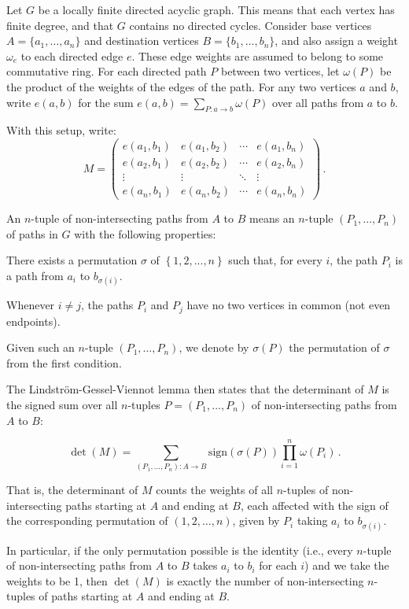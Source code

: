 Let $G$ be a locally finite directed acyclic graph. This means that each vertex has finite degree, and that $G$ contains no directed cycles. Consider base vertices $A = \{ a_1, \ldots, a_n \}$ and destination vertices $B = \{ b_1, \ldots, b_n \}$, and also assign a weight $\omega_{e}$ to each directed edge $e$. These edge weights are assumed to belong to some commutative ring. For each directed path $P$ between two vertices, let $ \omega(P) $ be the product of the weights of the edges of the path. For any two vertices $a$ and $b$, write $e(a,b)$ for the sum $e(a,b) = \sum_{P: a \to b} \omega(P)$ over all paths from $a$ to $b$.

With this setup, write:
$$M = \begin{pmatrix} e(a_1,b_1) & e(a_1,b_2) & \cdots & e(a_1,b_n) \\ e(a_2,b_1) & e(a_2,b_2) & \cdots & e(a_2,b_n) \\ \vdots & \vdots & \ddots & \vdots \\ e(a_n,b_1) & e(a_n,b_2) & \cdots & e(a_n,b_n) \end{pmatrix}\,.$$

An $n$-tuple of non-intersecting paths from $A$ to $B$ means an $n$-tuple $(P_1, \ldots, P_n)$ of paths in $G$ with the following properties:

\begin{compactenum}
\item There exists a permutation $\sigma$ of $\left\{ 1, 2, ..., n \right\}$ such that, for every $i$, the path $P_i$ is a path from $a_i$ to $b_{\sigma(i)}$.
\item Whenever $i \neq j$, the paths $P_i$ and $P_j$ have no two vertices in common (not even endpoints).
\end{compactenum}

Given such an $n$-tuple $(P_1, \ldots, P_n)$, we denote by $\sigma(P)$ the permutation of $\sigma$ from the first condition.

The Lindström-Gessel-Viennot lemma then states that the determinant of $M$ is the signed sum over all $n$-tuples $P = (P_1, \ldots, P_n)$ of non-intersecting paths from $A$ to $B$:

$$\det(M) = \sum_{(P_1,\ldots,P_n) \colon A \to B} \mathrm{sign}(\sigma(P)) \prod_{i=1}^n \omega(P_i)\,.$$

That is, the determinant of $M$ counts the weights of all $n$-tuples of non-intersecting paths starting at $A$ and ending at $B$, each affected with the sign of the corresponding permutation of $(1,2,\ldots,n)$, given by $ P_i $ taking $ a_i $ to $ b_{\sigma(i)} $.

In particular, if the only permutation possible is the identity (i.e., every $n$-tuple of non-intersecting paths from $A$ to $B$ takes $a_i$ to $b_i$ for each $i$) and we take the weights to be 1, then $\det(M)$ is exactly the number of non-intersecting $n$-tuples of paths starting at $A$ and ending at $B$.
